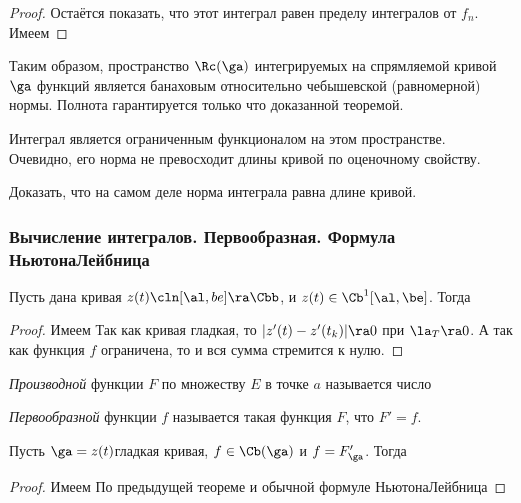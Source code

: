 \documentclass[a4paper]{article}
\begin{document}
\begin{solution}
\begin{proof}
Остаётся показать, что этот интеграл равен пределу интегралов от $f_n$.
Имеем
\hfill\end{proof}

Таким образом, пространство $\Rc(\ga)$ интегрируемых на спрямляемой кривой $\ga$ функций является банаховым относительно
чебышевской (равномерной) нормы. Полнота гарантируется только что доказанной теоремой.

Интеграл является ограниченным функционалом на этом пространстве. Очевидно, его норма не превосходит длины
кривой по оценочному свойству.

\begin{problem}
Доказать, что на самом деле норма интеграла равна длине кривой.
\end{problem}

\subsubsection{Вычисление интегралов. Первообразная. Формула Ньютона\ч Лейбница}

\begin{theorem}
Пусть дана кривая $z(t)\cln[\al,be]\ra\Cbb$, и $z(t)\in\Cb^1[\al,\be]$. Тогда
\end{theorem}
\begin{proof}
Имеем
Так как кривая гладкая, то $|z'(t)-z'(t_k)|\ra 0$ при $\la_T\ra 0$. А так как функция $f$ ограничена, то и вся сумма стремится к нулю.
\end{proof}

\begin{df}
\emph{Производной} функции $F$ по множеству $E$ в точке $a$ называется число
\end{df}

\begin{df}
\emph{Первообразной} функции $f$ называется такая функция $F$, что $F' =f$.
\end{df}

\begin{theorem}
Пусть $\ga=z(t)$\т гладкая кривая, $f\in\Cb(\ga)$ и $f = F'_\ga$. Тогда
\end{theorem}
\begin{proof}
Имеем
По предыдущей теореме и обычной формуле Ньютона\ч Лейбница
\hfill\end{proof}




\end{solution}
\end{document}
